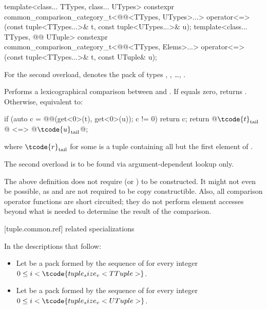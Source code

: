 %
\begin{itemdecl}
template<class... TTypes, class... UTypes>
  constexpr common_comparison_category_t<@@<TTypes, UTypes>...>
    operator<=>(const tuple<TTypes...>& t, const tuple<UTypes...>& u);
template<class... TTypes, @@ UTuple>
  constexpr common_comparison_category_t<@@<TTypes, Elems>...>
    operator<=>(const tuple<TTypes...>& t, const UTuple& u);
\end{itemdecl}

\begin{itemdescr}
\pnum
For the second overload,  denotes the pack of types
,
, \ldots,
.

\pnum
\effects
Performs a lexicographical comparison between  and .
If  equals zero,
returns .
Otherwise, equivalent to:
\begin{codeblock}
if (auto c = @@(get<0>(t), get<0>(u)); c != 0) return c;
return @$\tcode{t}_\mathrm{tail}$@ <=> @$\tcode{u}_\mathrm{tail}$@;
\end{codeblock}
where $\tcode{r}_\mathrm{tail}$ for some 
is a tuple containing all but the first element of .

\pnum
\remarks
The second overload is to be found via argument-dependent lookup only.
\end{itemdescr}

\pnum
\begin{note}
The above definition does not require 
(or ) to be constructed. It might not
even be possible, as  and  are not required to be copy
constructible. Also, all comparison operator functions are short circuited;
they do not perform element accesses beyond what is needed to determine the
result of the comparison.
\end{note}

[tuple.common.ref]{ related specializations}

\pnum
In the descriptions that follow:
\begin{itemize}
\item
Let  be a pack formed by
the sequence of 
for every integer $0 \leq i < \tcode{tuple_size_v<TTuple>}$.

\item
Let  be a pack formed by
the sequence of 
for every integer $0 \leq i < \tcode{tuple_size_v<UTuple>}$.
\end{itemize}

